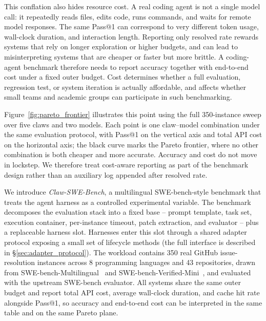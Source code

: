\documentclass{llmxive}
\begin{document}
This conflation also hides resource cost. A real coding agent is not a single model call: it repeatedly reads files, edits code, runs commands, and waits for remote model responses. The same Pass@1 can correspond to very different token usage, wall-clock duration, and interaction length. Reporting only resolved rate rewards systems that rely on longer exploration or higher budgets, and can lead to misinterpreting systems that are cheaper or faster but more brittle. A coding-agent benchmark therefore needs to report accuracy together with end-to-end cost under a fixed outer budget. Cost determines whether a full evaluation, regression test, or system iteration is actually affordable, and affects whether small teams and academic groups can participate in such benchmarking.

Figure~\ref{fig:pareto_frontier} illustrates this point using the full 350-instance sweep over five claws and two models. Each point is one claw--model combination under the same evaluation protocol, with Pass@1 on the vertical axis and total API cost on the horizontal axis; the black curve marks the Pareto frontier, where no other combination is both cheaper and more accurate. Accuracy and cost do not move in lockstep. We therefore treat cost-aware reporting as part of the benchmark design rather than an auxiliary log appended after resolved rate.

We introduce \emph{Claw-SWE-Bench}, a multilingual SWE-bench-style benchmark that treats the agent harness as a controlled experimental variable. The benchmark decomposes the evaluation stack into a fixed base -- prompt template, task set, execution container, per-instance timeout, patch extraction, and evaluator -- plus a replaceable harness slot. Harnesses enter this slot through a shared adapter protocol exposing a small set of lifecycle methods (the full interface is described in \S\ref{sec:adapter_protocol}). The workload contains 350 real GitHub issue-resolution instances across 8 programming languages and 43 repositories, drawn from SWE-bench-Multilingual~\cite{swe_smith} and SWE-bench-Verified-Mini~\cite{swebench_verified_mini}, and evaluated with the upstream SWE-bench evaluator. All systems share the same outer budget and report total API cost, average wall-clock duration, and cache hit rate alongside Pass@1, so accuracy and end-to-end cost can be interpreted in the same table and on the same Pareto plane.
\end{document}
